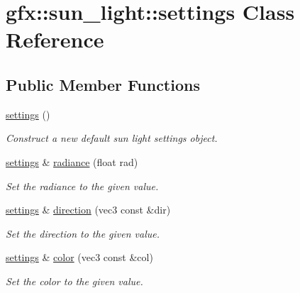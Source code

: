 \hypertarget{classgfx_1_1sun__light_1_1settings}{\section{gfx\-:\-:sun\-\_\-light\-:\-:settings Class Reference}
\label{classgfx_1_1sun__light_1_1settings}
}
\subsection*{Public Member Functions}
\begin{DoxyCompactItemize}
\item 
\hyperlink{classgfx_1_1sun__light_1_1settings_a9ffbc4c06dd5de0ce3bfb640022a8e78}{settings} ()
\begin{DoxyCompactList}\small\item\em Construct a new default sun light settings object. \end{DoxyCompactList}\item 
\hyperlink{classgfx_1_1sun__light_1_1settings}{settings} \& \hyperlink{classgfx_1_1sun__light_1_1settings_a0f2da132aa5f2b8b02889c98a7e12c85}{radiance} (float rad)
\begin{DoxyCompactList}\small\item\em Set the radiance to the given value. \end{DoxyCompactList}\item 
\hyperlink{classgfx_1_1sun__light_1_1settings}{settings} \& \hyperlink{classgfx_1_1sun__light_1_1settings_ad2a310d9de17d6b51de7774aebeb3812}{direction} (vec3 const \&dir)
\begin{DoxyCompactList}\small\item\em Set the direction to the given value. \end{DoxyCompactList}\item 
\hyperlink{classgfx_1_1sun__light_1_1settings}{settings} \& \hyperlink{classgfx_1_1sun__light_1_1settings_ac143dff375a48018149ca7749fc933c1}{color} (vec3 const \&col)
\begin{DoxyCompactList}\small\item\em Set the color to the given value. \end{DoxyCompactList}\end{DoxyCompactItemize}
